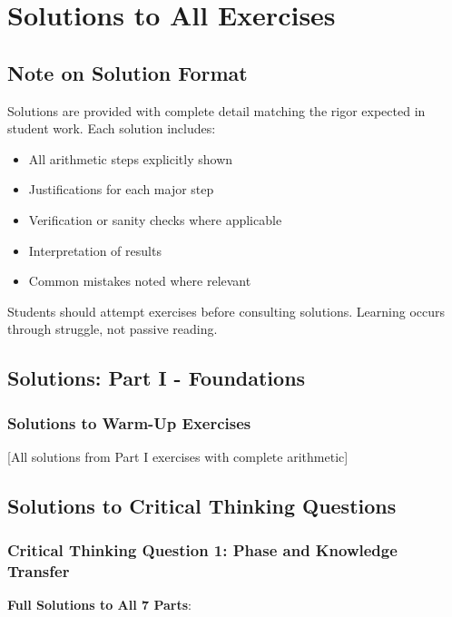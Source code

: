 
\chapter{Solutions to All Exercises}

\section*{Note on Solution Format}

Solutions are provided with complete detail matching the rigor expected in student work. Each solution includes:
\begin{itemize}
\item All arithmetic steps explicitly shown
\item Justifications for each major step
\item Verification or sanity checks where applicable
\item Interpretation of results
\item Common mistakes noted where relevant
\end{itemize}

Students should attempt exercises before consulting solutions. Learning occurs through struggle, not passive reading.

\section{Solutions: Part I - Foundations}

\subsection*{Solutions to Warm-Up Exercises}

[All solutions from Part I exercises with complete arithmetic]

\section{Solutions to Critical Thinking Questions}

\subsection*{Critical Thinking Question 1: Phase and Knowledge Transfer}

\textbf{Full Solutions to All 7 Parts}:

